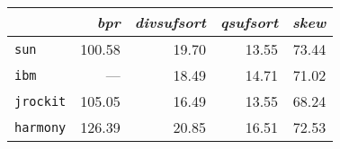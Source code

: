 \begin{tabular}{l r r r r } \toprule
 & \emph{bpr} & \emph{divsufsort} & \emph{qsufsort} & \emph{skew} \\ \midrule
\texttt{sun} & 100.58 & 19.70 & 13.55 & 73.44 \\
\texttt{ibm} & --- & 18.49 & 14.71 & 71.02 \\
\texttt{jrockit} & 105.05 & 16.49 & 13.55 & 68.24 \\
\texttt{harmony} & 126.39 & 20.85 & 16.51 & 72.53 \\
\bottomrule
\end{tabular}

